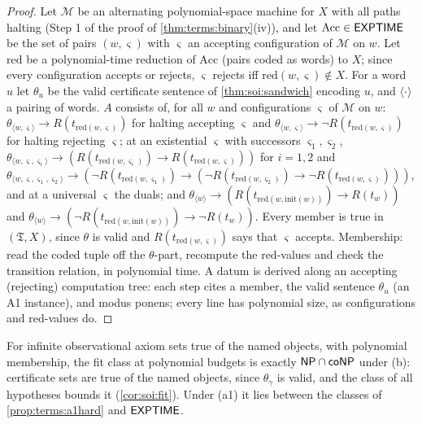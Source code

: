 \begin{proof}
Let $\mathcal M$ be an alternating polynomial-space machine for $X$ with all paths halting (Step 1 of the proof of \cref{thm:terms:binary}(iv)), and let $\mathrm{Acc}\in\mathsf{EXPTIME}$ be the set of pairs $(w,\varsigma)$ with $\varsigma$ an accepting configuration of $\mathcal M$ on $w$. Let $\mathrm{red}$ be a polynomial-time reduction of $\mathrm{Acc}$ (pairs coded as words) to $X$; since every configuration accepts or rejects, $\varsigma$ rejects iff $\mathrm{red}(w,\varsigma)\notin X$. For a word $u$ let $\theta_u$ be the valid certificate sentence of \cref{thm:soi:sandwich} encoding $u$, and $\langle\cdot\rangle$ a pairing of words. $A$ consists of, for all $w$ and configurations $\varsigma$ of $\mathcal M$ on $w$: $\theta_{\langle w,\varsigma\rangle}\to R(t_{\mathrm{red}(w,\varsigma)})$ for halting accepting $\varsigma$ and $\theta_{\langle w,\varsigma\rangle}\to\neg R(t_{\mathrm{red}(w,\varsigma)})$ for halting rejecting $\varsigma$; at an existential $\varsigma$ with successors $\varsigma_1,\varsigma_2$, $\theta_{\langle w,\varsigma,\varsigma_i\rangle}\to(R(t_{\mathrm{red}(w,\varsigma_i)})\to R(t_{\mathrm{red}(w,\varsigma)}))$ for $i=1,2$ and $\theta_{\langle w,\varsigma,\varsigma_1,\varsigma_2\rangle}\to(\neg R(t_{\mathrm{red}(w,\varsigma_1)})\to(\neg R(t_{\mathrm{red}(w,\varsigma_2)})\to\neg R(t_{\mathrm{red}(w,\varsigma)})))$, and at a universal $\varsigma$ the duals; and $\theta_{\langle w\rangle}\to(R(t_{\mathrm{red}(w,\mathrm{init}(w))})\to R(t_w))$ and $\theta_{\langle w\rangle}\to(\neg R(t_{\mathrm{red}(w,\mathrm{init}(w))})\to\neg R(t_w))$. Every member is true in $(\mathfrak T,X)$, since $\theta$ is valid and $R(t_{\mathrm{red}(w,\varsigma)})$ says that $\varsigma$ accepts. Membership: read the coded tuple off the $\theta$-part, recompute the $\mathrm{red}$-values and check the transition relation, in polynomial time. A datum is derived along an accepting (rejecting) computation tree: each step cites a member, the valid sentence $\theta_u$ (an A1 instance), and modus ponens; every line has polynomial size, as configurations and $\mathrm{red}$-values do.
\end{proof}

For infinite observational axiom sets true of the named objects, with polynomial membership, the fit class at polynomial budgets is exactly $\mathsf{NP}\cap\mathsf{coNP}$ under (b): certificate sets are true of the named objects, since $\theta_\gamma$ is valid, and the class of all hypotheses bounds it (\cref{cor:soi:fit}). Under (a1) it lies between the classes of \cref{prop:terms:a1hard} and $\mathsf{EXPTIME}$.

